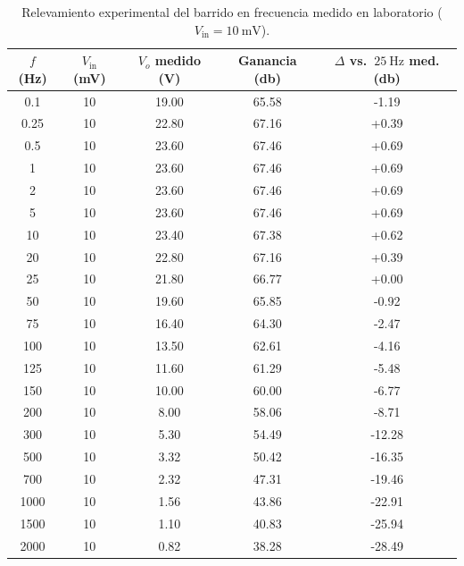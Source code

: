 \begin{table}[!ht]
  \centering
  \renewcommand{\arraystretch}{1.12}
  \caption{Relevamiento experimental del barrido en frecuencia medido en laboratorio ($V_{\text{in}} = \SI{10}{\milli\volt}$).}
  \label{tab:barrido_frecuencia}
  \begin{tabular}{|c|c|c|c|c|}
    \hline
    $f$ (\unit{\hertz}) & $V_{\text{in}}$ (\unit{\milli\volt}) & $V_o$ medido (\unit{\volt}) & Ganancia (\unit{\decibel}) & $\Delta$ vs.\ $\SI{25}{\hertz}$ med. (\unit{\decibel}) \\ \hline
    0.1  & 10 & 19.00 & 65.58 & -1.19 \\ \hline
    0.25 & 10 & 22.80 & 67.16 & +0.39 \\ \hline
    0.5  & 10 & 23.60 & 67.46 & +0.69 \\ \hline
    1    & 10 & 23.60 & 67.46 & +0.69 \\ \hline
    2    & 10 & 23.60 & 67.46 & +0.69 \\ \hline
    5    & 10 & 23.60 & 67.46 & +0.69 \\ \hline
    10   & 10 & 23.40 & 67.38 & +0.62 \\ \hline
    20   & 10 & 22.80 & 67.16 & +0.39 \\ \hline
    25   & 10 & 21.80 & 66.77 & +0.00 \\ \hline
    50   & 10 & 19.60 & 65.85 & -0.92 \\ \hline
    75   & 10 & 16.40 & 64.30 & -2.47 \\ \hline
    100  & 10 & 13.50 & 62.61 & -4.16 \\ \hline
    125  & 10 & 11.60 & 61.29 & -5.48 \\ \hline
    150  & 10 & 10.00 & 60.00 & -6.77 \\ \hline
    200  & 10 & 8.00  & 58.06 & -8.71 \\ \hline
    300  & 10 & 5.30  & 54.49 & -12.28 \\ \hline
    500  & 10 & 3.32  & 50.42 & -16.35 \\ \hline
    700  & 10 & 2.32  & 47.31 & -19.46 \\ \hline
    1000 & 10 & 1.56  & 43.86 & -22.91 \\ \hline
    1500 & 10 & 1.10  & 40.83 & -25.94 \\ \hline
    2000 & 10 & 0.82  & 38.28 & -28.49 \\ \hline
  \end{tabular}
\end{table}

\clearpage


